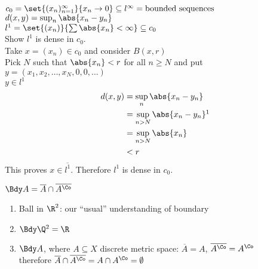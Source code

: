 \ex $c_0=\set{(x_n)^\infty_{n=1}}{x_n\to0}\subseteq l^\infty=\text{bounded sequences}$ \\
$d(x,y)=\sup_n\abs{x_n-y_n}$ \\
$l^1=\set{(x_n)}{\sum\abs{x_n}<\infty}\subseteq c_0$ \\
Show $l^1$ is dense in $c_0$. \\
Take $x=(x_n)\in c_0$ and consider $B(x,r)$ \\
Pick $N$ such that $\abs{x_n}<r$ for all $n\geq N$ and put $y=(x_1,x_2,\dotsc,x_N,0,0,\dotsc)$ \\
$y\in l^1$
\begin{align*}
d(x,y) &= \sup_n\abs{x_n-y_n} \\
&= \sup_{n>N}\abs{x_n-y_n}\footnotemark \\
&= \sup_{n>N}\abs{x_n} \\
&< r
\end{align*}%
This proves $x\in\overline{l^1}$.  Therefore $l^1$ is dense in $c_0$.

 $\Bdy A = \overline A \cap \overline{A^\Co}$

\begin{enumerate}
\item Ball in $\R^2$: our ``usual'' understanding of boundary
\item $\Bdy \Q\footnotemark = \R$
\item $\Bdy A$, where $A\subseteq X$ discrete metric space:
$\overline A = A$, $\overline{A^\Co}=A^\Co$ \\
therefore $\overline{A}\cap\overline{A^\Co}=A\cap A^\Co=\emptyset$
\end{enumerate}\footnotetext{$\subseteq\R$}
